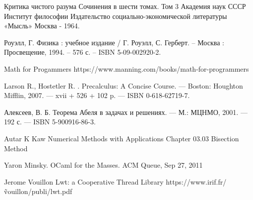 \begingroup
\renewcommand{\section}[2]{\Anonchapter{Список использованных источников}}
\begin{thebibliography}{00}

    Критика чистого разума
    Сочинения в шести томах.  
    Том 3
    Академия наук СССР
    Институт философии
    Издательство социально-экономической литературы
    «Мысль»
    Москва - 1964. \TODO

    Роуэлл, Г. Физика : учебное издание / Г. Роуэлл, С. Герберт. -- Москва : Просвещение, 1994. -- 576 с. -- ISBN 5-09-002920-2.

    Math for Progammers \TODO
    https://www.manning.com/books/math-for-programmers

    Larson R., Hostetler R. . Precalculus: A Concise Course. — Boston: Houghton Mifflin, 2007. — xvii + 526 + 102 p. — ISBN 0-618-62719-7. \TODO

    Алексеев, В. Б. Теорема Абеля в задачах и решениях. — М.: МЦНМО, 2001. — 192 с. — ISBN 5-900916-86-3. \TODO

    \TODO Autar K Kaw Numerical Methods with Applications Chapter 03.03 Bisection Method

    Yaron Minsky. OCaml for the Masses. ACM Queue, Sep 27, 2011 \TODO

    Jerome Vouillon Lwt: a Cooperative Thread Library \TODO
    https://www.irif.fr/\~vouillon/publi/lwt.pdf

\end{thebibliography}
\endgroup

\clearpage
